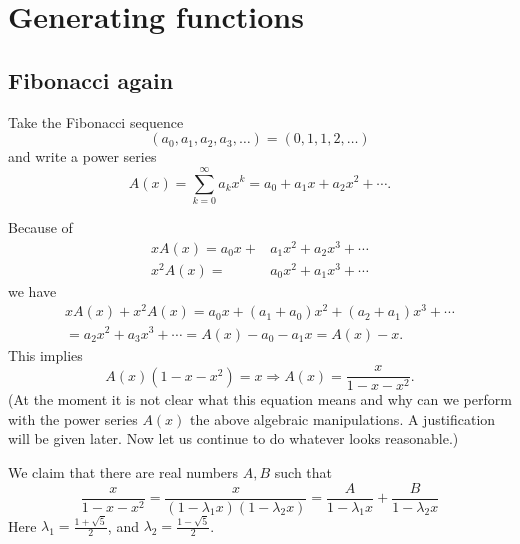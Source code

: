 \begin{page}
\setcounter{section}{2}
\setcounter{subsection}{1}
\setcounter{dfn}{0}
\label{portion:723}

\section{Generating functions}


\end{page}

\begin{page}
\setcounter{section}{2}
\setcounter{subsection}{2}
\setcounter{dfn}{0}
\label{portion:724}

\subsection{Fibonacci again}
\label{sec:FibAgain}
Take the Fibonacci sequence
\[
(a_0, a_1, a_2, a_3, \ldots) = (0, 1, 1, 2, \ldots)
\]
and write a power series
\[
A(x) = \sum_{k=0}^\infty a_k x^k = a_0 + a_1 x + a_2 x^2 + \cdots.
\]

Because of
\begin{align*}
xA(x)  = a_0x + & a_1x^2 + a_2x^3 + \cdots\\
x^2A(x)  = & a_0x^2 + a_1x^3 + \cdots
\end{align*}
we have
\begin{multline*}
xA(x) + x^2A(x) = a_0 x + (a_1+a_0)x^2 + (a_2+a_1)x^3 + \cdots\\
= a_2x^2 + a_3x^3 + \cdots = A(x) - a_0 - a_1 x = A(x) - x.
\end{multline*}
This implies
\[
A(x)(1-x-x^2) = x \Rightarrow A(x) = \frac{x}{1-x-x^2}.
\]
(At the moment it is not clear what this equation means and why can we perform with the power series $A(x)$ the above algebraic manipulations.
A justification will be given later. Now let us continue to do whatever looks reasonable.)

We claim that there are real numbers $A, B$ such that
\[
\frac{x}{1-x-x^2} = \frac{x}{(1-\lambda_1x)(1-\lambda_2x)} = \frac{A}{1-\lambda_1x} + \frac{B}{1-\lambda_2x}
\]
Here $\lambda_1 = \frac{1+\sqrt{5}}2$, and $\lambda_2 = \frac{1-\sqrt{5}}2$.


\end{page}
